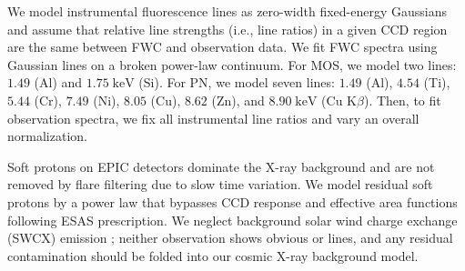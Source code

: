 \documentclass[twocolumn,tighten,trackchanges]{aastex61}
\newcommand*{\mt}{\mathrm}
\newcommand*{\unit}[1]{\;\mt{#1}}  %
\begin{document}
We model instrumental fluorescence lines as zero-width fixed-energy Gaussians
and assume that relative line strengths (i.e., line ratios) in a given CCD
region are the same between FWC and observation data.
We fit FWC spectra using Gaussian lines on a broken power-law continuum.
For MOS, we model two lines: $1.49$ (Al) and $1.75 \unit{keV}$ (Si).
For PN, we model seven lines: $1.49$ (Al), $4.54$ (Ti), $5.44$ (Cr),
$7.49$ (Ni), $8.05$ (Cu), $8.62$ (Zn), and $8.90 \unit{keV}$ (Cu K$\beta$).
Then, to fit observation spectra, we fix all instrumental line ratios and vary
an overall normalization.
%

Soft protons on EPIC detectors dominate the X-ray background and are not
removed by flare filtering due to slow time variation.
We model residual soft protons by a power law that bypasses CCD response and
effective area functions following ESAS prescription.
We neglect background solar wind charge exchange (SWCX) emission
\citep{snowden2004, carter2011};
neither observation shows obvious  or  lines, and any
residual contamination should be folded into our cosmic X-ray background model.
\end{document}

